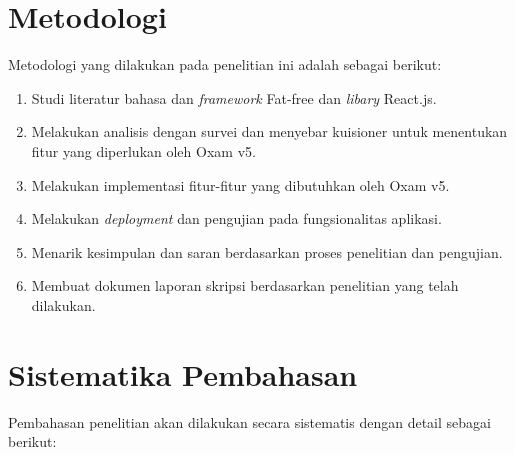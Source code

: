 \section{Metodologi}
Metodologi yang dilakukan pada penelitian ini adalah sebagai berikut:
\label{sec:metlit}
    \begin{enumerate}
        \item Studi literatur bahasa dan \textit{framework} Fat-free dan
            \textit{libary} React.js.
        \item Melakukan analisis dengan survei dan menyebar kuisioner untuk menentukan fitur yang diperlukan oleh
            Oxam v5.
		\item Melakukan implementasi fitur-fitur yang dibutuhkan oleh Oxam v5.
	    \item Melakukan \textit{deployment} dan pengujian pada fungsionalitas
	        aplikasi.
        \item Menarik kesimpulan dan saran berdasarkan proses penelitian dan
            pengujian.
        \item Membuat dokumen laporan skripsi berdasarkan penelitian yang telah dilakukan.
    \end{enumerate}

\section{Sistematika Pembahasan}
\label{sec:sispem}

Pembahasan penelitian akan dilakukan secara sistematis dengan detail sebagai
berikut:

